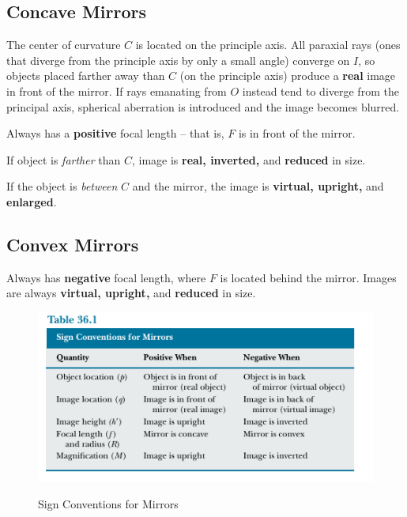 \documentclass[a4paper,10pt]{report}
\begin{document}
\subsection{Concave Mirrors}
The center of curvature $C$ is located on the principle axis. All paraxial rays (ones that diverge from the principle axis by only a small angle) converge on $I$, so objects placed farther away than $C$ (on the principle axis) produce a \textbf{real} image in front of the mirror. If rays emanating from $O$ instead tend to diverge from the principal axis, spherical aberration is introduced and the image becomes blurred.

Always has a \textbf{positive} focal length -- that is, $F$ is in front of the mirror.

If object is \textit{farther} than $C$, image is \textbf{real, inverted,} and \textbf{reduced} in size.

If the object is \textit{between} $C$ and the mirror, the image is \textbf{virtual, upright,} and \textbf{enlarged}.

\subsection{Convex Mirrors}
Always has \textbf{negative} focal length, where $F$ is located behind the mirror.
Images are always \textbf{virtual, upright,} and \textbf{reduced} in size.
\begin{figure}[h!]
  \begin{centering}
  \begin{center}
  \includegraphics[width=\linewidth]{./mirrorsignconv.png}
  \label{fig:mirror_sign_conventions}
  \caption{Sign Conventions for Mirrors}
  \end{center}
  \par\end{centering}
  \end{figure}
\end{document}
